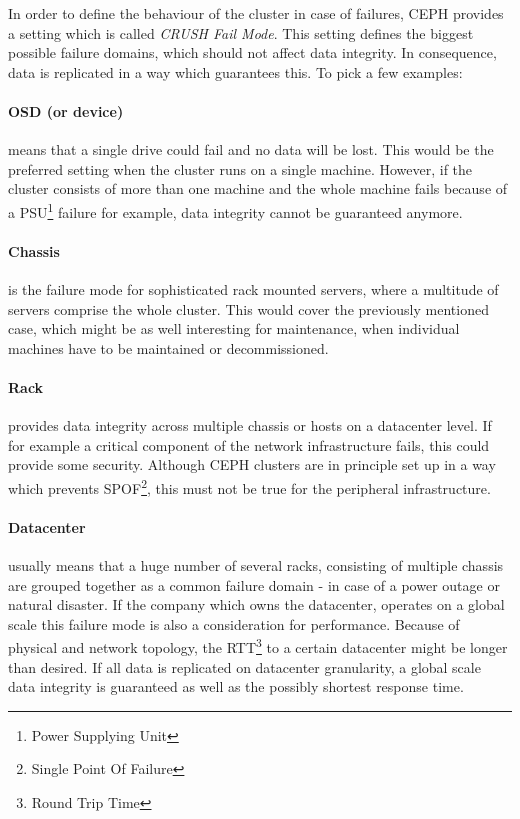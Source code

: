 \documentclass[titlepage, a4paper, 11pt]{scrartcl}
\begin{document}
                In order to define the behaviour of the cluster in case of failures, CEPH provides a setting
                which is called \textit{CRUSH Fail Mode}. This setting defines the biggest possible failure domains, 
                which should not affect data integrity\cite{crushFailure}. In consequence, data is replicated in a
                way which guarantees this. To pick a few examples: 

                \paragraph{OSD (or device)} means that a single drive could fail and no data will be lost.
                This would be the preferred setting when the cluster runs on a single machine. However, if the cluster
                consists of more than one machine and the whole machine fails because of a PSU\footnote{Power Supplying Unit} failure
                for example, data integrity cannot be guaranteed anymore.

                \paragraph{Chassis} is the failure mode for sophisticated rack mounted servers, where a multitude of servers
                comprise the whole cluster. This would cover the previously mentioned case, which might be as well interesting for maintenance,
                when individual machines have to be maintained or decommissioned.
                
                \paragraph{Rack} provides data integrity across multiple chassis or hosts on a datacenter level. If for example
                a critical component of the network infrastructure fails, this could provide some security. Although CEPH clusters 
                are in principle set up in a way which prevents SPOF\footnote{Single Point Of Failure}, this must not be true for the
                peripheral infrastructure. 

                \paragraph{Datacenter} usually means that a huge number of several racks, consisting of multiple chassis are grouped
                together as a common failure domain - in case of a power outage or natural disaster. If the company which owns the datacenter,
                operates on a global scale this failure mode is also a consideration for performance. Because of physical and network
                topology, the RTT\footnote{Round Trip Time} to a certain datacenter might be longer than desired. If all data is replicated
                on datacenter granularity, a global scale data integrity is guaranteed as well as the possibly shortest response time.
\end{document}
